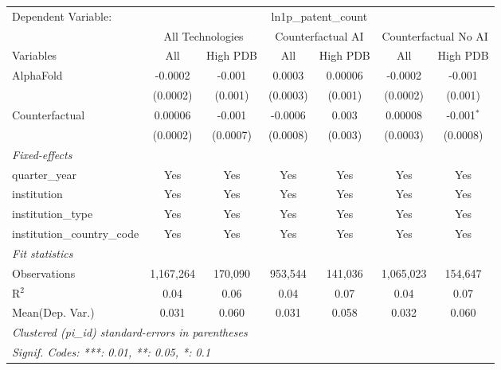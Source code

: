 \begingroup
\centering
\begin{tabular}{lcccccc}
   \tabularnewline \midrule \midrule
   Dependent Variable: & \multicolumn{6}{c}{ln1p\_patent\_count}\\
 & \multicolumn{2}{c}{All Technologies} & \multicolumn{2}{c}{Counterfactual AI} & \multicolumn{2}{c}{Counterfactual No AI} \\
\cmidrule(lr){1-1}\cmidrule(lr){2-3} \cmidrule(lr){4-5} \cmidrule(lr){6-7}
Variables & \multicolumn{1}{c}{All} & \multicolumn{1}{c}{High PDB} & \multicolumn{1}{c}{All} & \multicolumn{1}{c}{High PDB} & \multicolumn{1}{c}{All} & \multicolumn{1}{c}{High PDB} \\
\cmidrule(lr){1-1}\cmidrule(lr){2-2} \cmidrule(lr){3-3} \cmidrule(lr){4-4} \cmidrule(lr){5-5} \cmidrule(lr){6-6} \cmidrule(lr){7-7}
   AlphaFold                    & -0.0002   & -0.001   & 0.0003   & 0.00006 & -0.0002   & -0.001\\   
                                & (0.0002)  & (0.001)  & (0.0003) & (0.001) & (0.0002)  & (0.001)\\   
   Counterfactual               & 0.00006   & -0.001   & -0.0006  & 0.003   & 0.00008   & -0.001$^{*}$\\   
                                & (0.0002)  & (0.0007) & (0.0008) & (0.003) & (0.0003)  & (0.0008)\\   
   \midrule
   \emph{Fixed-effects}\\
   quarter\_year                & Yes       & Yes      & Yes      & Yes     & Yes       & Yes\\  
   institution                  & Yes       & Yes      & Yes      & Yes     & Yes       & Yes\\  
   institution\_type            & Yes       & Yes      & Yes      & Yes     & Yes       & Yes\\  
   institution\_country\_code   & Yes       & Yes      & Yes      & Yes     & Yes       & Yes\\  
   \midrule
   \emph{Fit statistics}\\
   Observations                 & 1,167,264 & 170,090  & 953,544  & 141,036 & 1,065,023 & 154,647\\  
   R$^2$                        & 0.04      & 0.06     & 0.04     & 0.07    & 0.04      & 0.07\\  
Mean(Dep. Var.) & 0.031 & 0.060 & 0.031 & 0.058 & 0.032 & 0.060 \\
   \midrule \midrule
   \multicolumn{7}{l}{\emph{Clustered (pi\_id) standard-errors in parentheses}}\\
   \multicolumn{7}{l}{\emph{Signif. Codes: ***: 0.01, **: 0.05, *: 0.1}}\\
\end{tabular}
\par\endgroup
